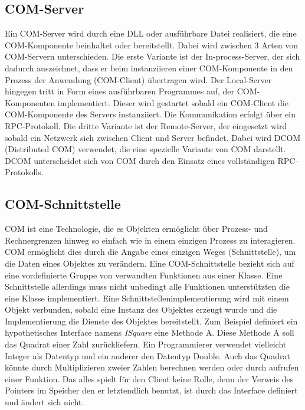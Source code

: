 \subsection{COM-Server}
\label{ch:grundlagen:sec:ComponentObjectModel:subsec:COMServer}

Ein COM-Server wird durch eine DLL oder ausführbare Datei realisiert, die eine COM-Komponente beinhaltet oder bereitstellt. Dabei wird zwischen 3 Arten von COM-Servern unterschieden. Die erste Variante ist der In-process-Server, der sich dadurch auszeichnet, dass er beim instanziieren einer COM-Komponente in den Prozess der Anwendung (COM-Client) übertragen wird. Der Local-Server hingegen tritt in Form eines ausführbaren Programmes auf, der COM-Komponenten implementiert. Dieser wird gestartet sobald ein COM-Client die COM-Komponente des Servers instanziiert. Die Kommunikation erfolgt über ein RPC-Protokoll. Die dritte Variante ist der Remote-Server, der eingesetzt wird sobald ein Netzwerk sich zwischen Client und Server befindet. Dabei wird DCOM (Distributed COM) verwendet, die eine spezielle Variante von COM darstellt. DCOM unterscheidet sich von COM durch den Einsatz eines vollständigen RPC-Protokolls. 
 
\subsection{COM-Schnittstelle}
\label{ch:grundlagen:sec:ComponentObjectModel:subsec:COMSchnittstelle}

COM ist eine Technologie, die es Objekten ermöglicht über Prozess- und Rechnergrenzen hinweg so einfach wie in einem einzigen Prozess zu interagieren. COM ermöglicht dies durch die Angabe eines einzigen Weges (Schnittstelle), um die Daten eines Objektes zu verändern. Eine COM-Schnittstelle bezieht sich auf eine vordefinierte Gruppe von verwandten Funktionen aus einer Klasse. Eine Schnittstelle allerdings muss nicht unbedingt alle Funktionen unterstützten die eine Klasse implementiert. Eine Schnittstellenimplementierung wird mit einem Objekt verbunden, sobald eine Instanz des Objektes erzeugt wurde und die Implementierung die Dienste des Objektes bereitstellt. Zum Beispiel definiert ein hypothetisches Interface namens \textit{ISquare} eine Methode A. Diese Methode A soll das Quadrat einer Zahl zurückliefern. Ein Programmierer verwendet vielleicht Integer als Datentyp und ein anderer den Datentyp Double. Auch das Quadrat könnte durch Multiplizieren zweier Zahlen berechnen werden oder durch aufrufen einer Funktion. Das alles spielt für den Client keine Rolle, denn der Verweis des Pointers im Speicher den er letztendlich benutzt, ist durch das Interface definiert und ändert sich nicht. 

